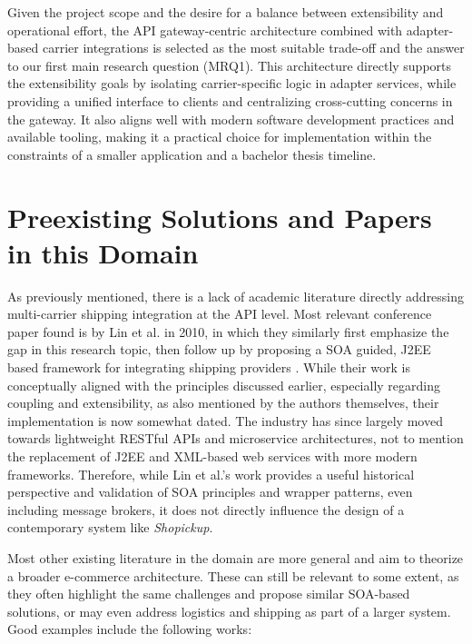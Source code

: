\documentclass{imc-inf}
\begin{document}
Given the project scope and the desire for a balance between extensibility and operational effort, the API gateway-centric architecture combined with adapter-based carrier integrations is selected as the most suitable trade-off and the answer to our first main research question (MRQ1).
This architecture directly supports the extensibility goals by isolating carrier-specific logic in adapter services, while providing a unified interface to clients and centralizing cross-cutting concerns in the gateway.
It also aligns well with modern software development practices and available tooling, making it a practical choice for implementation within the constraints of a smaller application and a bachelor thesis timeline.

\section{Preexisting Solutions and Papers in this Domain}
As previously mentioned, there is a lack of academic literature directly addressing multi-carrier shipping integration at the API level.
Most relevant conference paper found is by Lin et al. in 2010, in which they similarly first emphasize the gap in this research topic, then follow up by proposing a SOA guided, J2EE based framework for integrating shipping providers \cite{linResearchShippingECommerce2010}.
While their work is conceptually aligned with the principles discussed earlier, especially regarding coupling and extensibility, as also mentioned by the authors themselves, their implementation is now somewhat dated.
The industry has since largely moved towards lightweight RESTful APIs and microservice architectures, not to mention the replacement of J2EE and XML-based web services with more modern frameworks.
Therefore, while Lin et al.'s work provides a useful historical perspective and validation of SOA principles and wrapper patterns, even including message brokers, it does not directly influence the design of a contemporary system like \textit{Shopickup}.

Most other existing literature in the domain are more general and aim to theorize a broader e-commerce architecture.
These can still be relevant to some extent, as they often highlight the same challenges and propose similar SOA-based solutions, or may even address logistics and shipping as part of a larger system.
Good examples include the following works:
\end{document}
